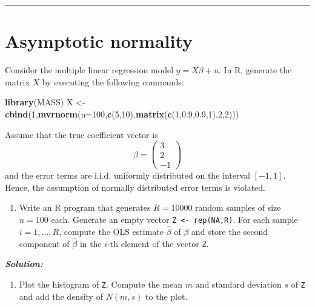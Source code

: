 \documentclass[]{article}
\newenvironment{Shaded}{\begin{snugshade}}{\end{snugshade}}
\newcommand{\KeywordTok}[1]{\textcolor[rgb]{0.13,0.29,0.53}{\textbf{#1}}}
\newcommand{\DataTypeTok}[1]{\textcolor[rgb]{0.13,0.29,0.53}{#1}}
\newcommand{\DecValTok}[1]{\textcolor[rgb]{0.00,0.00,0.81}{#1}}
\newcommand{\FloatTok}[1]{\textcolor[rgb]{0.00,0.00,0.81}{#1}}
\newcommand{\StringTok}[1]{\textcolor[rgb]{0.31,0.60,0.02}{#1}}
\newcommand{\NormalTok}[1]{#1}
\providecommand{\tightlist}{%
  \setlength{\itemsep}{0pt}\setlength{\parskip}{0pt}}
\begin{document}
\pagebreak

\begin{center}\rule{0.5\linewidth}{\linethickness}\end{center}

\section{Asymptotic normality}\label{asymptotic-normality}

Consider the multiple linear regression model \(y=X\beta +u\). In R,
generate the matrix \(X\) by executing the following commands:

\begin{Shaded}
\begin{Highlighting}[]
\KeywordTok{library}\NormalTok{(MASS)}
\NormalTok{X <-}\StringTok{ }\KeywordTok{cbind}\NormalTok{(}\DecValTok{1}\NormalTok{,}\KeywordTok{mvrnorm}\NormalTok{(}\DataTypeTok{n=}\DecValTok{100}\NormalTok{,}\KeywordTok{c}\NormalTok{(}\DecValTok{5}\NormalTok{,}\DecValTok{10}\NormalTok{),}\KeywordTok{matrix}\NormalTok{(}\KeywordTok{c}\NormalTok{(}\DecValTok{1}\NormalTok{,}\FloatTok{0.9}\NormalTok{,}\FloatTok{0.9}\NormalTok{,}\DecValTok{1}\NormalTok{),}\DecValTok{2}\NormalTok{,}\DecValTok{2}\NormalTok{)))}
\end{Highlighting}
\end{Shaded}

Assume that the true coefficient vector is \[
\beta =\left(
\begin{array}{c}
3 \\
2 \\
-1
\end{array}
\right)
\] and the error terms are i.i.d. uniformly distributed on the interval
\([-1,1]\). Hence, the assumption of normally distributed error terms is
violated.

\begin{enumerate}
\def\labelenumi{\arabic{enumi}.}
\tightlist
\item
  Write an R program that generates \(R=10000\) random samples of size
  \(n=100\) each. Generate an empty vector
  \texttt{Z\ \textless{}-\ rep(NA,R)}. For each sample
  \(i=1,\ldots ,R\), compute the OLS estimate \(\hat{\beta}\) of
  \(\beta\) and store the second component of \(\hat{\beta}\) in the
  \(i\)-th element of the vector \texttt{Z}.
\end{enumerate}

\textbf{\emph{Solution:}}

\begin{enumerate}
\def\labelenumi{\arabic{enumi}.}
\setcounter{enumi}{1}
\tightlist
\item
  Plot the histogram of \texttt{Z}. Compute the mean \(m\) and standard
  deviation \(s\) of \texttt{Z} and add the density of \(N(m,s)\) to the
  plot.
\end{enumerate}
\end{document}
